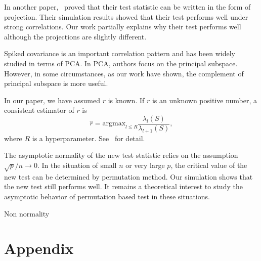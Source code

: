 \documentclass[review]{elsarticle}
\theoremstyle{plain}
\newtheorem{lemma}{\quad\quad Lemma}
\theoremstyle{definition}
\theoremstyle{remark}
\begin{document}

In another paper,~\cite{Zhao2016A} proved that their test statistic can be written in the form of projection. Their simulation results showed that their test performs well under strong correlations.
Our work partially explains why their test performs well although the projections are slightly different. 

 Spiked covariance is an important correlation pattern and has been widely studied in terms of PCA\@.
 In PCA, authors focus on the principal subspace.
 However, in some circumstances, as our work have shown, the complement of principal subspace is more useful. 

In our paper, we have assumed $r$ is known. If $r$ is an unknown positive number, a consistent estimator of $r$ is
\begin{equation}\label{estimateR}
    \hat{r}=\textrm{argmax}_{l\leq R}\frac{\lambda_l(S)}{\lambda_{l+1}(S)},
\end{equation}
where $R$ is a hyperparameter.
    See~\cite{Ahn2009Eigenvalue} for detail.


The asymptotic normality of the new test statistic relies on the assumption $\sqrt{p}/n\to 0$. In the situation of small $n$ or very large $p$, the critical value of the new test can be determined by permutation method. Our simulation shows that the new test still performs well. It remains a theoretical interest to study the asymptotic behavior of permutation based test in these situations.

{\color{red}
Non normality
}


\section*{Appendix}

\end{document}
